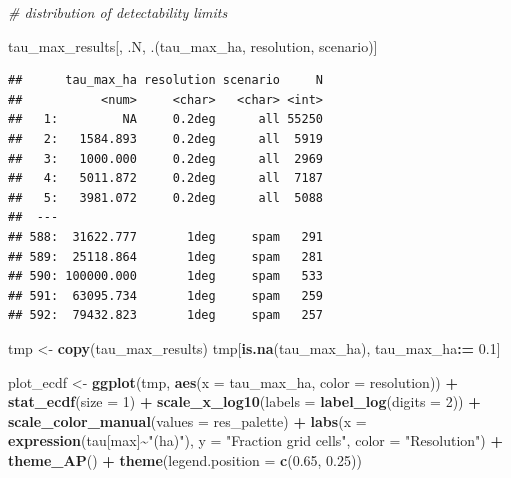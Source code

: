 \documentclass[
  11pt,
]{article}
\newenvironment{Shaded}{\begin{snugshade}}{\end{snugshade}}
\newcommand{\AttributeTok}[1]{\textcolor[rgb]{0.13,0.29,0.53}{#1}}
\newcommand{\CommentTok}[1]{\textcolor[rgb]{0.56,0.35,0.01}{\textit{#1}}}
\newcommand{\DecValTok}[1]{\textcolor[rgb]{0.00,0.00,0.81}{#1}}
\newcommand{\FloatTok}[1]{\textcolor[rgb]{0.00,0.00,0.81}{#1}}
\newcommand{\FunctionTok}[1]{\textcolor[rgb]{0.13,0.29,0.53}{\textbf{#1}}}
\newcommand{\NormalTok}[1]{#1}
\newcommand{\OtherTok}[1]{\textcolor[rgb]{0.56,0.35,0.01}{#1}}
\newcommand{\SpecialCharTok}[1]{\textcolor[rgb]{0.81,0.36,0.00}{\textbf{#1}}}
\newcommand{\StringTok}[1]{\textcolor[rgb]{0.31,0.60,0.02}{#1}}
\begin{document}
\begin{Shaded}
\begin{Highlighting}[]
\CommentTok{\# distribution of detectability limits}

\NormalTok{tau\_max\_results[, .N, .(tau\_max\_ha, resolution, scenario)]}
\end{Highlighting}
\end{Shaded}

\begin{verbatim}
##      tau_max_ha resolution scenario     N
##           <num>     <char>   <char> <int>
##   1:         NA     0.2deg      all 55250
##   2:   1584.893     0.2deg      all  5919
##   3:   1000.000     0.2deg      all  2969
##   4:   5011.872     0.2deg      all  7187
##   5:   3981.072     0.2deg      all  5088
##  ---                                     
## 588:  31622.777       1deg     spam   291
## 589:  25118.864       1deg     spam   281
## 590: 100000.000       1deg     spam   533
## 591:  63095.734       1deg     spam   259
## 592:  79432.823       1deg     spam   257
\end{verbatim}

\begin{Shaded}
\begin{Highlighting}[]
\NormalTok{tmp }\OtherTok{\textless{}{-}} \FunctionTok{copy}\NormalTok{(tau\_max\_results)}
\NormalTok{tmp[}\FunctionTok{is.na}\NormalTok{(tau\_max\_ha), tau\_max\_ha}\SpecialCharTok{:=} \FloatTok{0.1}\NormalTok{]}

\NormalTok{plot\_ecdf }\OtherTok{\textless{}{-}} \FunctionTok{ggplot}\NormalTok{(tmp, }\FunctionTok{aes}\NormalTok{(}\AttributeTok{x =}\NormalTok{ tau\_max\_ha, }\AttributeTok{color =}\NormalTok{ resolution)) }\SpecialCharTok{+}
  \FunctionTok{stat\_ecdf}\NormalTok{(}\AttributeTok{size =} \DecValTok{1}\NormalTok{) }\SpecialCharTok{+}
  \FunctionTok{scale\_x\_log10}\NormalTok{(}\AttributeTok{labels =} \FunctionTok{label\_log}\NormalTok{(}\AttributeTok{digits =} \DecValTok{2}\NormalTok{)) }\SpecialCharTok{+}
  \FunctionTok{scale\_color\_manual}\NormalTok{(}\AttributeTok{values =}\NormalTok{ res\_palette) }\SpecialCharTok{+}
  \FunctionTok{labs}\NormalTok{(}\AttributeTok{x =} \FunctionTok{expression}\NormalTok{(tau[max]}\SpecialCharTok{\textasciitilde{}}\StringTok{"(ha)"}\NormalTok{), }\AttributeTok{y =} \StringTok{"Fraction grid cells"}\NormalTok{,}
       \AttributeTok{color =} \StringTok{"Resolution"}\NormalTok{) }\SpecialCharTok{+}
  \FunctionTok{theme\_AP}\NormalTok{() }\SpecialCharTok{+}
  \FunctionTok{theme}\NormalTok{(}\AttributeTok{legend.position =} \FunctionTok{c}\NormalTok{(}\FloatTok{0.65}\NormalTok{, }\FloatTok{0.25}\NormalTok{))}
\end{Highlighting}
\end{Shaded}
\end{document}
